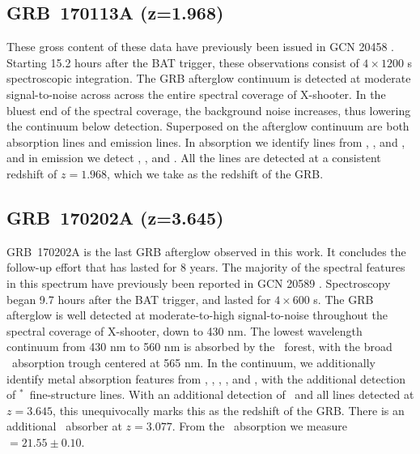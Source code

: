 \documentclass[longauth]{aa}    %
\begin{document}
\subsection{GRB~170113A (z=1.968)}\label{170113}

These gross content of these data have previously been issued in GCN 20458
\citep{GCN20458}. Starting 15.2 hours after the BAT trigger, these observations
consist of $4 \times 1200$ s spectroscopic integration. The GRB afterglow
continuum is detected at moderate signal-to-noise across across the entire
spectral coverage of X-shooter. In the bluest end of the spectral coverage, the
background noise increases, thus lowering the continuum below detection.
Superposed on the afterglow continuum are both absorption lines and emission
lines. In absorption we identify lines from \SIii, \feii, and \mgii, and in
emission we detect \oii, \hb, and \oiii. All the lines are detected at a
consistent redshift of $z=1.968$, which we take as the redshift of the GRB.

\subsection{GRB~170202A (z=3.645)}\label{170202}

GRB~170202A is the last GRB afterglow observed in this work. It concludes the
follow-up effort that has lasted for 8 years. The majority of the spectral
features in this spectrum have previously been reported in GCN 20589
\citep{GCN20589}. Spectroscopy began 9.7 hours after the BAT trigger, and lasted
for $4 \times 600$ s. The GRB afterglow is well detected at moderate-to-high
signal-to-noise throughout the spectral coverage of X-shooter, down to 430 nm.
The lowest wavelength continuum from 430 nm to 560 nm is absorbed by the
\lya~forest, with the broad \lya~absorption trough centered at 565 nm. In the
continuum, we additionally identify metal absorption features from \SIii, \civ,
\SIiv, \feii, and \mgii, with the additional detection of
\SIii$^*$~fine-structure lines. With an additional detection of \oiii~and all
lines detected at $z=3.645$, this unequivocally marks this as the redshift of
the GRB. There is an additional \civ~absorber at $z = 3.077$. From the
\lya~absorption we measure \nh$= 21.55 \pm 0.10$.

%
%
\end{document}
